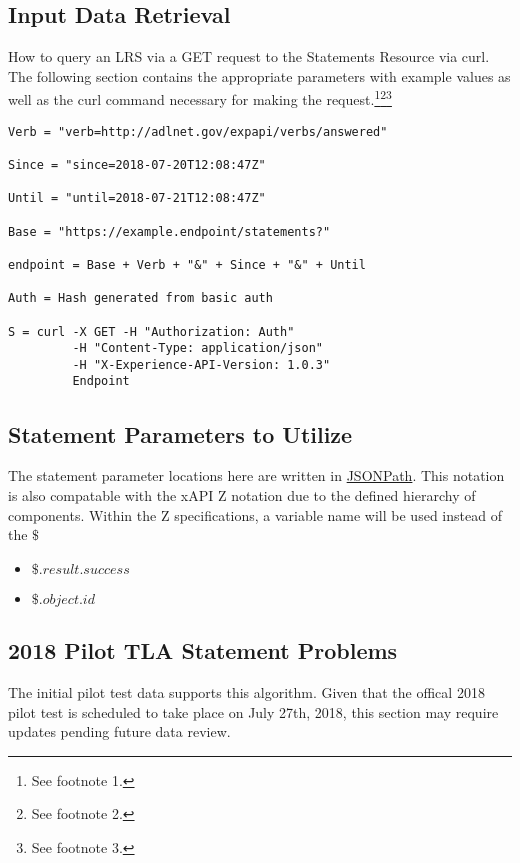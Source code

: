\documentclass{article}
\begin{document}
\subsection{Input Data Retrieval}
How to query an LRS via a GET request to the Statements Resource via
curl. The following section contains the appropriate parameters with
example values as well as the curl command necessary for making the request.\footnote{\label{refMoreLink} See footnote 1.}\footnote{\label{refnoZ} See footnote 2.}\footnote{\label{refallTime} See footnote 3.}

\begin{lstlisting}[frame=single]
Verb = "verb=http://adlnet.gov/expapi/verbs/answered"

Since = "since=2018-07-20T12:08:47Z"

Until = "until=2018-07-21T12:08:47Z"

Base = "https://example.endpoint/statements?"

endpoint = Base + Verb + "&" + Since + "&" + Until

Auth = Hash generated from basic auth

S = curl -X GET -H "Authorization: Auth"
         -H "Content-Type: application/json"
         -H "X-Experience-API-Version: 1.0.3"
         Endpoint
\end{lstlisting}

\subsection{Statement Parameters to Utilize}

The statement parameter locations here are written in
\href{http://goessner.net/articles/JsonPath/}{JSONPath}. This notation
is also compatable with the xAPI Z notation due to the defined
hierarchy of components. Within the Z specifications, a variable name
will be used instead of the $\$$
\begin{itemize}
\item $\$.result.success$
\item $\$.object.id$
\end{itemize}

\subsection{2018 Pilot TLA Statement Problems}
The initial pilot test data supports this algorithm.
Given that the offical 2018 pilot test is scheduled to take place on July
27th, 2018, this section may require updates pending future data review.
\end{document}
